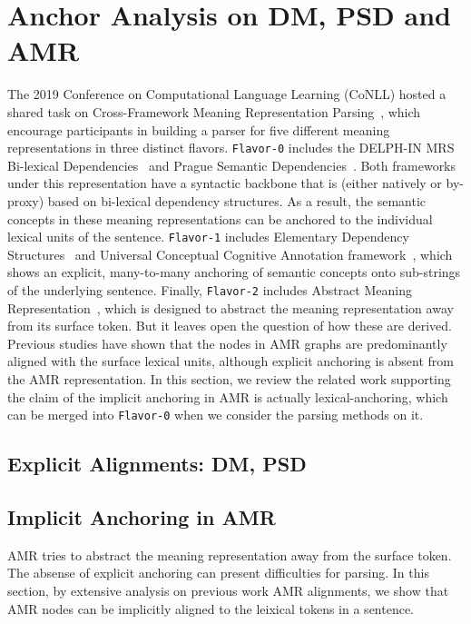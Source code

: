 \section{Anchor Analysis on DM, PSD and AMR}
\label{sec:lex:lex-intro}

The 2019 Conference on Computational Language Learning (CoNLL) hosted
a shared task on Cross-Framework Meaning Representation
Parsing~\cite[MRP 2019,][]{Oep:Abe:Haj:19}, which encourage
participants in building a parser for five different meaning
representations in three distinct flavors. \texttt{Flavor-0} includes
the DELPH-IN MRS Bi-lexical Dependencies~\cite[DM,][]{ivanova2012did}
and Prague Semantic
Dependencies~\cite[PSD,][]{hajic2012announcing,miyao2014house}. Both
frameworks under this representation have a syntactic backbone that is
(either natively or by-proxy) based on bi-lexical dependency
structures. As a result, the semantic concepts in these meaning
representations can be anchored to the individual lexical units of the
sentence. \texttt{Flavor-1} includes Elementary Dependency
Structures~\cite[EDS,][]{oepen2006discriminant} and Universal
Conceptual Cognitive Annotation
framework~\cite[UCCA,][]{abend2013universal}, which shows an explicit,
many-to-many anchoring of semantic concepts onto sub-strings of the
underlying sentence. Finally, \texttt{Flavor-2} includes Abstract
Meaning Representation~\cite[AMR,][]{Banarescu:LWPjKI7N}, which is
designed to abstract the meaning representation away from its surface
token. But it leaves open the question of how these are
derived. Previous studies have shown that the nodes in AMR graphs are
predominantly aligned with the surface lexical units, although
explicit anchoring is absent from the AMR representation.  In this
section, we review the related work supporting the claim of the
implicit anchoring in AMR is actually lexical-anchoring, which can be
merged into \texttt{Flavor-0} when we consider the parsing methods on
it.

\subsection{Explicit Alignments: DM, PSD}
\label{ssec:lex:bi-lexical-anchor}


\subsection{Implicit Anchoring in AMR}
\label{ssec:lex:amr-anchor}
AMR tries to abstract the meaning representation away from the surface
token. The absense of explicit anchoring can present difficulties for
parsing. In this section, by extensive analysis on previous work AMR
alignments, we show that AMR nodes can be implicitly aligned to the
leixical tokens in a sentence.

